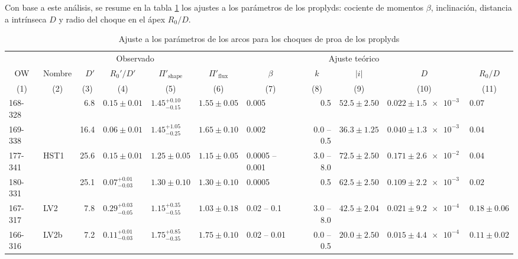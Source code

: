 Con base a este análisis, se resume en la tabla \ref{tab:arc-fits} los ajustes a los parámetros de los proplyds: cociente de momentos $\beta$, inclinación, distancia a \thC{} intrínseca $D$ y radio del choque en el ápex $R_0/D$.
\begin{landscape}
  \begin{table}
    \centering
  \caption{Ajuste a los parámetros de los arcos para los choques de proa de los proplyds}
  \label{tab:arc-fits} 
  \newcommand\C[1]{\multicolumn{1}{c}{#1}}
  \begin{adjustbox}{width=1.35\textwidth}
    \small
\begin{tabular}{llrllllrlll}\toprule
             &          & \multicolumn{3}{c}{\dotfill Observado \dotfill}              & \multicolumn{6}{c}{\dotfill Ajuste teórico \dotfill} \\ 
  \C{OW}     & \C{Nombre} & \(D'\) &\C{ \(R_0'/D'\) }&\C{ \(\Pi'_{\mathrm{shape}}\) }&\C{ \(\Pi'_{\mathrm{flux}}\) }&\C{ \(\beta\) }&\C{ \(k\) }&\C{ \(|i|\) }&\C{ \(D\) }&\C{ \(R_0/D\)}\\
  \C{(1)}& \C{ (2) }&\C{ (3)    }&\C{    (4)      }&\C{              (5)           }&\C{           (6)             }&\C{     (7)   }&\C{   (8)   }&\C{   (9) }&\C{  (10) }&\C{   (11)} \\
\midrule     
 168-328  &            &    6.8  &  $0.15 \pm 0.01$  &  $1.45^{+0.10}_ {-0.15}$   &  $1.55 \pm 0.05$     &  0.005  &  0.5  &  $52.5 \pm 2.50$   &  $0.022 \pm \SI{1.5e-3}{}$  &  $0.07$  \\
 169-338  &            &  16.4  &  $0.06 \pm 0.01$  &  $1.45^{+1.05}_{-0.25}$   &  $1.65 \pm 0.10$     &  0.002  &  0.0 -- 0.5  &  $36.3 \pm 1.25$   &  $0.040 \pm \SI{1.3e-3}{}$  &  $0.04$  \\
 177-341  & HST1   & 25.6  &  $0.15 \pm 0.01$  &  $1.25 \pm 0.05$   &  $1.15 \pm 0.05$     &  0.0005 -- 0.001  &  3.0 -- 8.0  &  $72.5 \pm 2.50$   &  $0.171 \pm \SI{2.6e-2}{}$  &  $0.04$  \\
 180-331  &             &  25.1  &  $0.07^{+0.01}_{-0.03}$  &  $1.30 \pm 0.10$   &  $1.30 \pm 0.10$     &  0.0005  &  0.5  &  $62.5 \pm 2.50$   &  $0.109 \pm \SI{2.2e-3}{}$  &  $0.02$  \\
 167-317  &  LV2     &    7.8  &  $0.29^{+0.03}_{-0.05}$  &  $1.15^{+0.35}_{-0.55}$   &  $1.03 \pm 0.18$      &  0.02 -- 0.1  &  3.0 -- 8.0  &  $42.5 \pm 2.04$  &  $0.021 \pm \SI{9.2e-4}{}$  &  $0.18 \pm 0.06$  \\
 166-316  & LV2b    &   7.2  &  $0.11^{+0.01}_{-0.03}$  &  $1.75^{+0.85}_{-0.35}$   &  $1.75 \pm 0.10$     &  0.02 -- 0.01  &  0.0 -- 0.5  &  $20.0 \pm 2.50$  &  $0.015 \pm \SI{4.4e-4}{}$  &  $0.11 \pm 0.02$  \\

\end{tabular}
\end{adjustbox}
\end{table}
\end{landscape}
